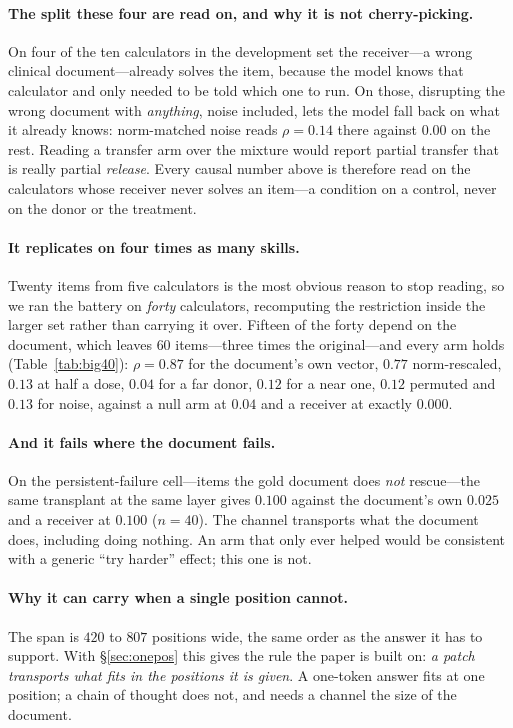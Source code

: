 \documentclass{article}
\begin{document}
\paragraph{The split these four are read on, and why it is not cherry-picking.}
On four of the ten calculators in the development set the receiver---a wrong
clinical document---already solves the item, because the model knows that
calculator and only needed to be told which one to run. On those, disrupting the
wrong document with \emph{anything}, noise included, lets the model fall back on
what it already knows: norm-matched noise reads $\rho = 0.14$ there against
$0.00$ on the rest. Reading a transfer arm over the mixture would report partial
transfer that is really partial \emph{release}. Every causal number above is
therefore read on the calculators whose receiver never solves an item---a
condition on a control, never on the donor or the treatment.

\paragraph{It replicates on four times as many skills.} Twenty items from five
calculators is the most obvious reason to stop reading, so we ran the battery on
\emph{forty} calculators, recomputing the restriction inside the larger set
rather than carrying it over. Fifteen of the forty depend on the document, which
leaves $60$ items---three times the original---and every arm holds
(Table~\ref{tab:big40}): $\rho = 0.87$ for the document's own vector, $0.77$
norm-rescaled, $0.13$ at half a dose, $0.04$ for a far donor, $0.12$ for a near
one, $0.12$ permuted and $0.13$ for noise, against a null arm at $0.04$ and a
receiver at exactly $0.000$.



\paragraph{And it fails where the document fails.} On the persistent-failure
cell---items the gold document does \emph{not} rescue---the same transplant at
the same layer gives $0.100$ against the document's own $0.025$ and a receiver
at $0.100$ ($n=40$). The channel transports what the document does, including
doing nothing. An arm that only ever helped would be consistent with a generic
``try harder'' effect; this one is not.

\paragraph{Why it can carry when a single position cannot.} The span is $420$ to
$807$ positions wide, the same order as the answer it has to support. With
\S\ref{sec:onepos} this gives the rule the paper is built on: \emph{a patch
transports what fits in the positions it is given}. A one-token answer fits at
one position; a chain of thought does not, and needs a channel the size of the
document.
\end{document}
